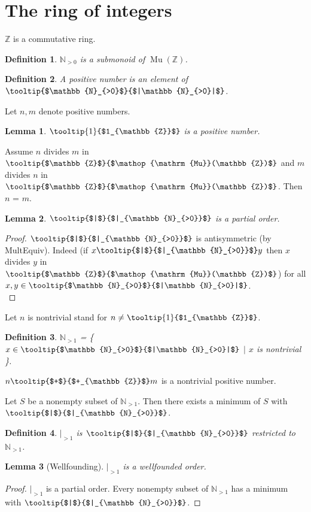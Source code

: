 \documentclass{article}
\DeclareMathOperator{\MuC}{Mu}
\newcommand{\sG}[1]{\mbox{\tooltip{$#1$}{$|#1|$}}}
\newcommand{\pR}[1]{\mbox{\tooltip{$+$}{$+_{#1}$}}}
\newcommand{\Mu}[1]{\mbox{\tooltip{$#1$}{$\MuC(#1)$}}}
\newcommand{\oR}[1]{\mbox{\tooltip{1}{$1_{#1}$}}}
\newcommand{\oC}[1]{#1}
\newcommand{\Z}{\mathbb{Z}}
\newcommand{\NPOS}{\mathbb{N}_{>1}}
\newcommand{\NDIV}{\vert_{>1}}
\newcommand{\DIVI}[1]{\mbox{\tooltip{$|$}{$|_{#1}$}}}
\newcommand{\MoPos}{\mathbb{N}_{>0}}
\newtheorem*{definition}{Definition}
\newtheorem{lemma}{Lemma}
\begin{document}
\section{The ring of integers}
\begin{forthel}
	\begin{signature}
		$\Z$ is a commutative ring.
	\end{signature}

	\begin{definition}
		$\MoPos$ is a submonoid of $\MuC(\Z)$.
	\end{definition}
	\begin{definition}
		A positive number is an element of $\sG{\MoPos}$.
	\end{definition}
	Let $n,m$ denote positive numbers.

	\begin{lemma}
		$\oR{\Z}$ is a positive number.
	\end{lemma}
	
	\begin{axiom}[MultEquiv]
		Assume $n$ divides $m$ in  $\Mu{\Z}$ and $m$ divides $n$ in $\Mu{\Z}$. Then $n$ = $m$.
	\end{axiom}

	\begin{lemma}
		$\DIVI{\MoPos}$ is a partial order.
	\end{lemma}
	\begin{proof} 
		$\DIVI{\MoPos}$ is antisymmetric (by MultEquiv). 
		Indeed (if $x \oC{\DIVI{\MoPos}} y$ then $x$ divides $y$ in $\Mu{\Z}$) for all $x,y \in \sG{\MoPos}$.  \\
	\end{proof}
	Let $n$ is nontrivial stand for $n \neq \oR{\Z}$.
	\begin{definition}
		$\NPOS$ = \{$x \in \sG{\MoPos}$ $|$ $x$ is nontrivial \}.
	\end{definition}
	\begin{axiom}
		$n \pR{\Z} m$ is a nontrivial positive number.
	\end{axiom}
	\begin{axiom}
		Let $S$ be a nonempty subset of $\NPOS$. Then there exists a minimum of $S$ with $\DIVI{\MoPos}$.
	\end{axiom}
	\begin{definition}
		$\NDIV$ is $\DIVI{\MoPos}$ restricted to $\NPOS$.
	\end{definition}
	\begin{lemma}[Wellfounding]
		$\NDIV$ is a wellfounded order.
	\end{lemma}
	\begin{proof}
		$\NDIV$ is a partial order. Every nonempty subset of $\NPOS$ has a minimum with $\DIVI{\MoPos}$.
	\end{proof}
\end{forthel}
\end{document}

